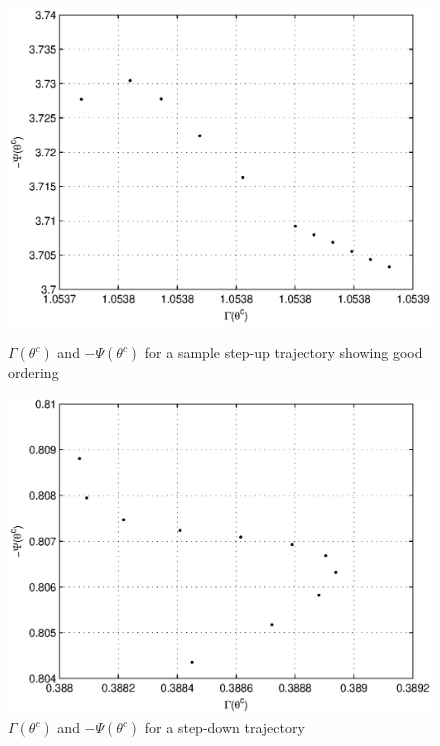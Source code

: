 \begin{figure}
\begin{minipage}{0.48\textwidth}
\centering
\includegraphics[width=\linewidth]{7Results/GPSU}
\caption{$\Gamma(\theta^c)$ and $-\Psi(\theta^c)$ for a sample step-up trajectory showing good ordering}
\label{fig:GPSU}
\end{minipage}
\hfill
\begin{minipage}{0.48\textwidth}
\centering
\includegraphics[width=\linewidth]{7Results/GPSD}
\caption{$\Gamma(\theta^c)$ and $-\Psi(\theta^c)$ for a step-down trajectory}
\label{fig:GPSD}
\end{minipage}
\end{figure}

